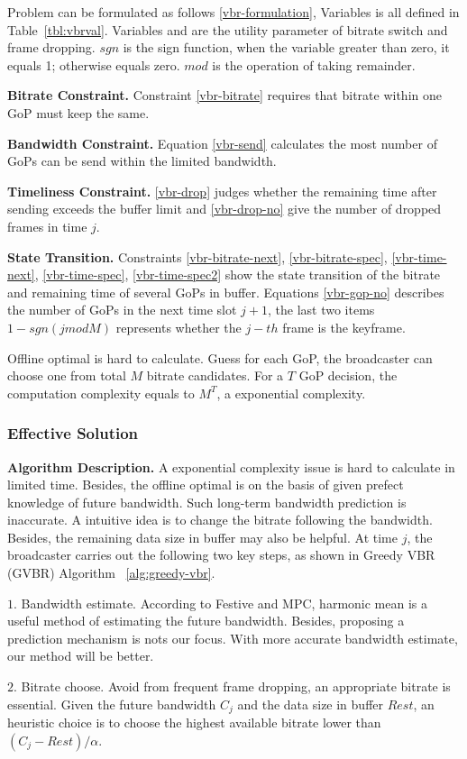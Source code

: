 Problem can be formulated as follows \ref{vbr-formulation}, Variables is all defined in Table~\ref{tbl:vbrval}. Variables and are the utility parameter of bitrate switch and frame dropping. $sgn$ is the sign function, when the variable greater than zero, it equals 1; otherwise equals zero. $mod$ is the operation of taking remainder.

\textbf{Bitrate Constraint.} Constraint \ref{vbr-bitrate} requires that bitrate within one GoP must keep the same.

\textbf{Bandwidth Constraint.} Equation \ref{vbr-send} calculates the most number of GoPs can be send within the limited bandwidth.

\textbf{Timeliness Constraint.} \ref{vbr-drop} judges whether the remaining time after sending exceeds the buffer limit and \ref{vbr-drop-no} give the number of dropped frames in time $j$.

\textbf{State Transition.} Constraints \ref{vbr-bitrate-next}, \ref{vbr-bitrate-spec}, \ref{vbr-time-next}, \ref{vbr-time-spec}, \ref{vbr-time-spec2} show the state transition of the bitrate and remaining time of several GoPs in buffer. Equations \ref{vbr-gop-no} describes the number of GoPs in the next time slot $j+1$, the last two items $1-sgn(j{mod}M)$ represents whether the $j-th$ frame is the keyframe.

Offline optimal is hard to calculate. Guess for each GoP, the broadcaster can choose one from total $M$ bitrate candidates. For a $T$ GoP decision, the computation complexity equals to $M^T$, a exponential complexity.

\subsubsection{Effective Solution}

\textbf{Algorithm Description.} A exponential complexity issue is hard to calculate in limited time. Besides, the offline optimal is on the basis of given prefect knowledge of future bandwidth. Such long-term bandwidth prediction is inaccurate. A intuitive idea is to change the bitrate following the bandwidth. Besides, the remaining data size in buffer may also be helpful. At time $j$, the broadcaster carries out the following two key steps, as shown in Greedy VBR (GVBR) Algorithm ~\ref{alg:greedy-vbr}.

$1.$ Bandwidth estimate. According to Festive and MPC, harmonic mean is a useful method of estimating the future bandwidth. Besides, proposing a prediction mechanism is nots our focus. With more accurate bandwidth estimate, our method will be better.

$2.$ Bitrate choose. Avoid from frequent frame dropping, an appropriate bitrate is essential. Given the future bandwidth $C_j$ and the data size in buffer $Rest$, an heuristic choice is to choose the highest available bitrate lower than $(C_j-Rest)/\alpha$.
